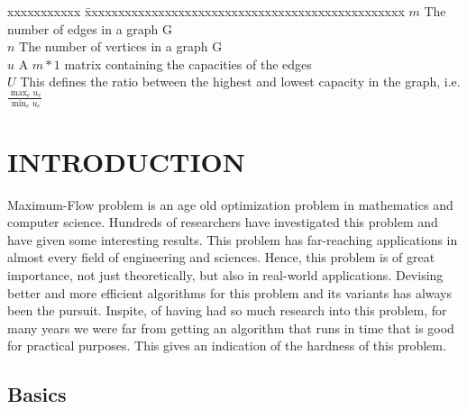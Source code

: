 \documentclass[BTech]{iitmdiss}
\begin{document}
 \begin{singlespace}
 \begin{tabbing}
 xxxxxxxxxxx \= xxxxxxxxxxxxxxxxxxxxxxxxxxxxxxxxxxxxxxxxxxxxxxxx \kill
 \textbf{$m$}  \> The number of edges in a graph G \\
 
 \textbf{$n$} \> The number of vertices in a graph G \\
 
 \textbf{$u$}  \> A $m \ast 1$ matrix containing the capacities of the edges \\
 
 \textbf{$U$}  \> This defines the ratio between the highest and lowest capacity in the graph, i.e.\\
		  \hspace{25mm}$\frac{\displaystyle\max_e u_e}{\displaystyle\min_e u_e}$ \\
 
 \end{tabbing}
 \end{singlespace}
 
 \pagebreak
 \clearpage




 \chapter{INTRODUCTION}
 \label{chap:intro}
    Maximum-Flow problem is an age old optimization problem in mathematics and computer science. Hundreds of researchers have investigated this problem
    and have given some interesting results. This problem has far-reaching applications in almost every field of engineering and sciences. Hence, this 
    problem is of great importance, not just theoretically, but also in real-world applications. Devising better and more efficient algorithms
    for this problem and its variants has always been the pursuit. Inspite, of having had so much research into this problem, for many years we were far from getting an algorithm
    that runs in time that is good for practical purposes. This gives an indication of the hardness of this problem.
    
    \section{Basics}
\end{document}
